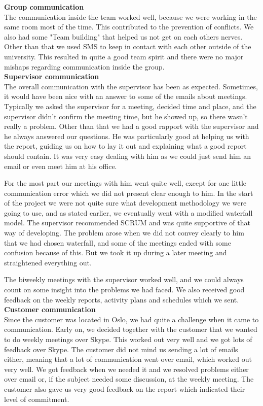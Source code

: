 
\indent \indent \textbf{Group communication} \\
The communication inside the team worked well, because we were working in the same room most of the time. This contributed to the prevention of conflicts. We also had some "Team building" that helped us not get on each others nerves. Other than that we used SMS to keep in contact with each other outside of the university. This resulted in quite a good team spirit and there were no major mishaps regarding communication inside the group.
\\

\textbf{Supervisor communication} \\
The overall communication with the supervisor has been as expected. Sometimes, it would have been nice with an answer to some of the emails about meetings. Typically we asked the supervisor for a meeting, decided time and place, and the supervisor didn't confirm the meeting time, but he showed up, so there wasn't really a problem. Other than that we had a good rapport with the supervisor and he always answered our questions. He was particularly good at helping us with the report, guiding us on how to lay it out and explaining what a good report should contain. It was very easy dealing with him as we could just send him an email or even meet him at his office.

For the most part our meetings with him went quite well, except for one little communication error which we did not present clear enough to him. In the start of the project we were not quite sure what development methodology we were going to use, and as stated earlier, we eventually went with a modified waterfall model. The supervisor recommended SCRUM and was quite supportive of that way of developing. The problem arose when we did not convey clearly to him that we had chosen waterfall, and some of the meetings ended with some confusion because of this. But we took it up during a later meeting and straightened everything out.

The biweekly meetings with the supervisor worked well, and we could always count on some insight into the problems we had faced. We also received good feedback on the weekly reports, activity plans and schedules which we sent.
\\ 

\textbf{Customer communication} \\
Since the customer was located in Oslo, we had quite a challenge when it came to communication. Early on, we decided together with the customer that we wanted to do weekly meetings over Skype. This worked out very well and we got lots of feedback over Skype. The customer did not mind us sending a lot of emails either, meaning that a lot of communication went over email, which worked out very well. We got feedback when we needed it and we resolved problems either over email or, if the subject needed some discussion, at the weekly meeting. The customer also gave us very good feedback on the report which indicated their level of commitment. 


